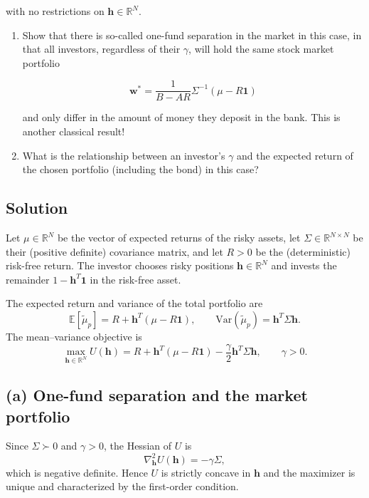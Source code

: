 \documentclass{article}
\begin{document}
with no restrictions on $\mathbf{h} \in \mathbb{R}^N$.

\begin{enumerate}

\item[(a)] Show that there is so-called one-fund separation in the market in this case, in that all investors, regardless of their $\gamma$, will hold the same stock market portfolio

\[
\mathbf{w}^* = \frac{1}{B - AR} \Sigma^{-1} (\mu - R \mathbf{1})
\]

and only differ in the amount of money they deposit in the bank. This is another classical result!

\item[(b)] What is the relationship between an investor's $\gamma$ and the expected return of the chosen portfolio (including the bond) in this case?

\end{enumerate}

\subsection*{Solution}

Let $\mu\in\mathbb{R}^N$ be the vector of expected returns of the risky assets, let $\Sigma\in\mathbb{R}^{N\times N}$ be their (positive definite) covariance matrix, and let $R>0$ be the (deterministic) risk-free return. The investor chooses risky positions $\mathbf h\in\mathbb{R}^N$ and invests the remainder $1-\mathbf h^T\mathbf 1$ in the risk-free asset.

The expected return and variance of the total portfolio are
\[
\mathbb{E}[\tilde{\mu}_p]=R+\mathbf h^T(\mu-R\mathbf 1),
\qquad
\mathrm{Var}(\tilde{\mu}_p)=\mathbf h^T\Sigma\mathbf h.
\]
The mean--variance objective is
\[
\max_{\mathbf h\in\mathbb{R}^N}
U(\mathbf h)
=
R+\mathbf h^T(\mu-R\mathbf 1)-\frac{\gamma}{2}\mathbf h^T\Sigma\mathbf h,
\qquad \gamma>0.
\]

\subsection*{(a) One-fund separation and the market portfolio}

Since $\Sigma\succ 0$ and $\gamma>0$, the Hessian of $U$ is
\[
\nabla_{\mathbf h}^2 U(\mathbf h)=-\gamma \Sigma,
\]
which is negative definite. Hence $U$ is strictly concave in $\mathbf h$ and the maximizer is unique and characterized by the first-order condition.
\end{document}
